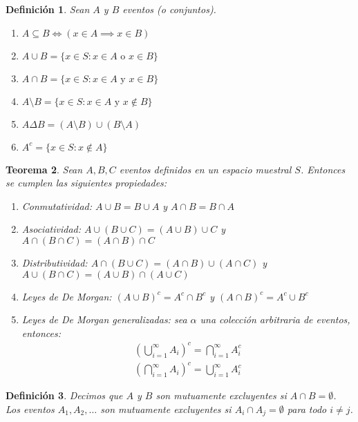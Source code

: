 \documentclass[14pt]{extarticle}
\newtheorem{theorem}{Teorema}[section]
\newtheorem{definition}[theorem]{Definición}
\begin{document}
\begin{definition}
    Sean $A$ y $B$ eventos (o conjuntos).
    \begin{enumerate}
        \item $A \subseteq B \iff (x \in A \implies x \in B)$
        \item $A \cup B = \{x \in S : x \in A \text{ o } x \in B\}$
        \item $A \cap B = \{x \in S : x \in A \text{ y } x \in B\}$
        \item $A \setminus B = \{x \in S : x \in A \text{ y } x \notin B\}$
        \item $A \Delta B = (A \setminus B) \cup (B \setminus A)$
        \item $A^c = \{x \in S : x \notin A\}$
    \end{enumerate}
\end{definition}
\begin{theorem}
    Sean $A, B, C$ eventos definidos en un espacio muestral $S$. Entonces se cumplen las siguientes propiedades:
    \begin{enumerate}
        \item Conmutatividad: $A \cup B = B \cup A$ y $A \cap B = B \cap A$
        \item Asociatividad: $A \cup (B \cup C) = (A \cup B) \cup C$ y $A \cap (B \cap C) = (A \cap B) \cap C$
        \item Distributividad: $A \cap (B \cup C) = (A \cap B) \cup (A \cap C)$ y $A \cup (B \cap C) = (A \cup B) \cap (A \cup C)$
        \item Leyes de De Morgan: $(A \cup B)^c = A^c \cap B^c$ y $(A \cap B)^c = A^c \cup B^c$
        \item Leyes de De Morgan generalizadas: sea $\alpha$ una colección arbitraria de eventos, entonces:     
        \begin{align*}
            (\bigcup_{i=1}^\infty A_i)^c = \bigcap_{i=1}^\infty A_i^c \\
            (\bigcap_{i=1}^\infty A_i)^c = \bigcup_{i=1}^\infty A_i^c
        \end{align*}
    \end{enumerate}
\end{theorem}

\begin{definition}
    Decimos que $A$ y $B$ son mutuamente excluyentes si $A \cap B = \emptyset$.
    Los eventos $A_1, A_2, \ldots$ son mutuamente excluyentes si $A_i \cap A_j = \emptyset$
    para todo $i \neq j$.
\end{definition}
\end{document}
